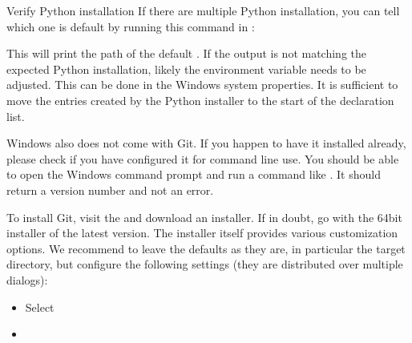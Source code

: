 \begin{description}
\begin{windowswit}[before title={\thetcbcounter\ }, check odd page=true]{Verify Python installation}
\sphinxAtStartPar
If there are multiple Python installation, you can tell which one is default by running this command in :

\begin{sphinxVerbatim}[commandchars=\\\{\}]
   
\end{sphinxVerbatim}

\sphinxAtStartPar
This will print the path of the default .
If the output is not matching the expected Python installation, likely the  environment variable needs to be adjusted.
This can be done in the Windows system properties.
It is sufficient to move the entries created by the Python installer to the start of the declaration list.


\end{windowswit}

\ignorespaces 
\sphinxAtStartPar
Windows also does not come with Git. If you happen to have it installed already,
please check if you have configured it for command line use. You should be able
to open the Windows command prompt and run a command like .
It should return a version number and not an error.

\sphinxAtStartPar
To install Git, visit the  and
download an installer. If in doubt, go with the 64bit installer of the latest
version. The installer itself provides various customization options. We
recommend to leave the defaults as they are, in particular the target
directory, but configure the following settings (they are distributed over
multiple dialogs):
\begin{itemize}
\item {} 
\sphinxAtStartPar
Select 

\item {} 
\sphinxAtStartPar
{}


\end{itemize}
\end{description}
